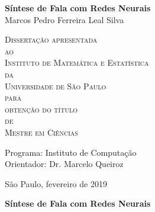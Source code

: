 \documentclass[11pt,twoside,a4paper]{book}
\begin{document}
\frontmatter 
\fancyhead[RO]{{\footnotesize\rightmark}\hspace{2em}\thepage}
\setcounter{tocdepth}{2}
\fancyhead[LE]{\thepage\hspace{2em}\footnotesize{\leftmark}}
\fancyhead[RE,LO]{}
\fancyhead[RO]{{\footnotesize\rightmark}\hspace{2em}\thepage}

\onehalfspacing  %

\thispagestyle{empty}
\begin{center}
    \vspace*{2.3cm}
    \textbf{\Large{Síntese de Fala com Redes Neurais}}\\
    
    \vspace*{1.2cm}
    \Large{Marcos Pedro Ferreira Leal Silva}
    
    \vskip 2cm
    \textsc{
    Dissertação apresentada\\[-0.25cm] 
    ao\\[-0.25cm]
    Instituto de Matemática e Estatística\\[-0.25cm]
    da\\[-0.25cm]
    Universidade de São Paulo\\[-0.25cm]
    para\\[-0.25cm]
    obtenção do título\\[-0.25cm]
    de\\[-0.25cm]
    Mestre em Ciências}
    
    \vskip 1.5cm
    Programa: Instituto de Computação\\
    Orientador: Dr. Marcelo Queiroz\\

   	\vskip 1cm
    
    \vskip 0.5cm
    \normalsize{São Paulo, fevereiro de 2019}
\end{center}

%
%
%
\newpage
\thispagestyle{empty}
    \begin{center}
        \vspace*{2.3 cm}
        \textbf{\Large{Síntese de Fala com Redes Neurais}}\\
        \vspace*{2 cm}
    \end{center}
\end{document}
